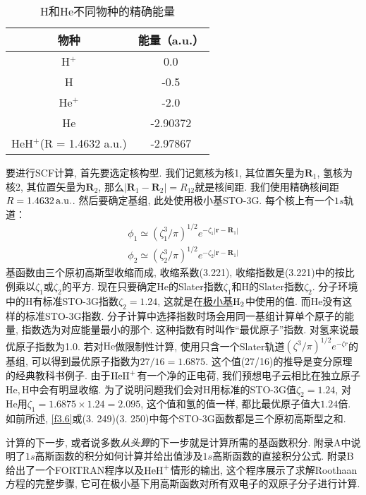 \begin{table}[H]
	\centering
	\caption{H和He不同物种的精确能量}
	\begin{tabular}{cc}
		\hline
		物种 & 能量（a.u.）\\\hline
		H$^+$      & 0.0\\
		H     & -0.5\\
		He$^+$     & -2.0\\
		He     & -2.90372\\
		HeH$^+$(R = 1.4632 a.u.)&-2.97867\\\hline
	\end{tabular}
	\label{t3.4}
\end{table}
要进行SCF计算, 首先要选定核构型. 
我们记氦核为核1, 其位置矢量为$\mathbf{R}_1$, 
氢核为核2, 其位置矢量为$\mathbf{R}_2$, 
那么$|\mathbf{R}_1-\mathbf{R}_2|=R_{12}$就是核间距. 
我们使用精确核间距$R=1.4632\,\mathrm{a.u.}$. 
然后要确定基组, 此处使用极小基STO-3G. 
每个核上有一个$1s$轨道：
\begin{align}
	\phi_1 \simeq (\zeta_1^3/\pi)^{1/2} e^{-\zeta_1|\mathbf{r-R}_1|}\\
	\phi_2 \simeq (\zeta_2^3/\pi)^{1/2} e^{-\zeta_2|\mathbf{r-R}_1|}
\end{align}
基函数由三个原初高斯型收缩而成, 
收缩系数(3.221), 
收缩指数是(3.221)中的按比例乘以$\zeta_1$或$\zeta_2$的平方. 
现在只要确定$\mathrm{He}$的Slater指数$\zeta_1$和$\mathrm{H}$的Slater指数$\zeta_2$. 
分子环境中的$\mathrm{H}$有标准STO-3G指数$\zeta_2=1.24$, 
这就是在\underline{极小基$\mathrm{H}_2$}中使用的值. 
而$\mathrm{He}$没有这样的标准STO-3G指数. 
分子计算中选择指数时场会用同一基组计算单个原子的能量, 
指数选为对应能量最小的那个. 
这种指数有时叫作``最优原子''指数. 
对氢来说最优原子指数为1.0. 
若对$\mathrm{He}$做限制性\hft 计算, 
使用只含一个Slater轨道$(\zeta^3/\pi)^{1/2}e^{-\zeta r}$的基组, 
可以得到最优原子指数为$27/16=1.6875$. 
这个值(27/16)的推导是变分原理的经典教科书例子.
由于$\mathrm{HeH}^+$有一个净的正电荷, 
我们预想电子云相比在独立原子$\mathrm{He,H}$中会有明显收缩. 
为了说明问题我们会对$\mathrm{H}$用标准的STO-3G值$\zeta_2=1.24$, 
对$\mathrm{He}$用$\zeta_1=1.6875\times 1.24=2.095$, 
这个值和氢的值一样, 
都比最优原子值大$1.24$倍. 
如前所述, 
\ref{f3.6}或(3.
249)(3.
250)中每个STO-3G函数都是三个原初高斯型之和.


计算的下一步, 
或者说多数\emph{从头算}的下一步就是计算所需的基函数积分. 
附录A中说明了$1s$高斯函数的积分如何计算并给出值涉及$1s$高斯函数的直接积分公式. 
附录B给出了一个FORTRAN程序以及$\mathrm{HeH}^+$情形的输出, 
这个程序展示了求解Roothaan方程的完整步骤, 
它可在极小基下用高斯函数对所有双电子的双原子分子进行计算. 

